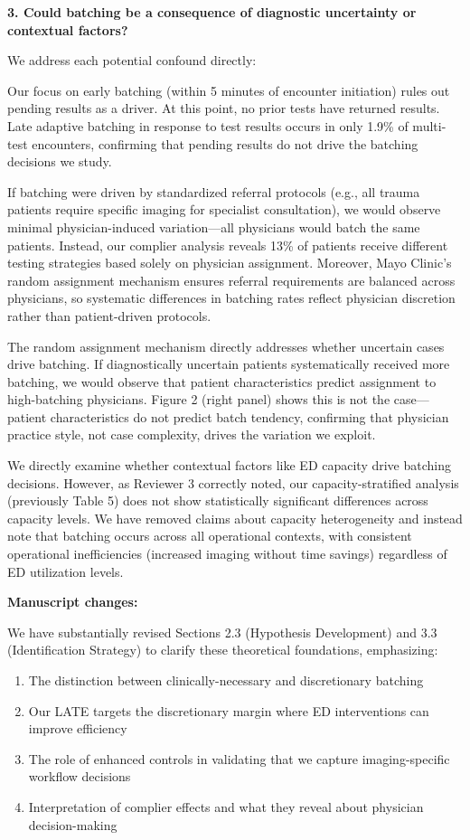 \documentclass[11pt]{article}
\newcommand{\1}{\hbox{\rm 1\kern-.35em 1}}
\begin{document}
\textbf{3. Could batching be a consequence of diagnostic uncertainty or contextual factors?}

We address each potential confound directly:

Our focus on early batching (within 5 minutes of encounter initiation) rules out pending results as a driver. At this point, no prior tests have returned results. Late adaptive batching in response to test results occurs in only 1.9\% of multi-test encounters, confirming that pending results do not drive the batching decisions we study.

If batching were driven by standardized referral protocols (e.g., all trauma patients require specific imaging for specialist consultation), we would observe minimal physician-induced variation—all physicians would batch the same patients. Instead, our complier analysis reveals 13\% of patients receive different testing strategies based solely on physician assignment. Moreover, Mayo Clinic's random assignment mechanism ensures referral requirements are balanced across physicians, so systematic differences in batching rates reflect physician discretion rather than patient-driven protocols.

The random assignment mechanism directly addresses whether uncertain cases drive batching. If diagnostically uncertain patients systematically received more batching, we would observe that patient characteristics predict assignment to high-batching physicians. Figure 2 (right panel) shows this is not the case—patient characteristics do not predict batch tendency, confirming that physician practice style, not case complexity, drives the variation we exploit.

We directly examine whether contextual factors like ED capacity drive batching decisions. However, as Reviewer 3 correctly noted, our capacity-stratified analysis (previously Table 5) does not show statistically significant differences across capacity levels. We have removed claims about capacity heterogeneity and instead note that batching occurs across all operational contexts, with consistent operational inefficiencies (increased imaging without time savings) regardless of ED utilization levels.

\textbf{Manuscript changes:}

We have substantially revised Sections 2.3 (Hypothesis Development) and 3.3 (Identification Strategy) to clarify these theoretical foundations, emphasizing:

\begin{enumerate}
\item The distinction between clinically-necessary and discretionary batching
\item Our LATE targets the discretionary margin where ED interventions can improve efficiency
\item The role of enhanced controls in validating that we capture imaging-specific workflow decisions
\item Interpretation of complier effects and what they reveal about physician decision-making
\end{enumerate}
\end{document}
